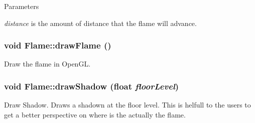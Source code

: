 \begin{DoxyParams}{Parameters}
\item[{\em distance}]is the amount of distance that the flame will advance. \end{DoxyParams}
\hypertarget{classFlame_a71b21d01230de74c83b5357f7a2955f3}{
\subsubsection[{drawFlame}]{\setlength{\rightskip}{0pt plus 5cm}void Flame::drawFlame ()}}
\label{classFlame_a71b21d01230de74c83b5357f7a2955f3}
Draw the flame in OpenGL. \hypertarget{classFlame_a9918c5c5e904393c830fc8672e37bc77}{
\subsubsection[{drawShadow}]{\setlength{\rightskip}{0pt plus 5cm}void Flame::drawShadow (float {\em floorLevel})}}
\label{classFlame_a9918c5c5e904393c830fc8672e37bc77}
Draw Shadow. Draws a shadown at the floor level. This is helfull to the users to get a better perspective on where is the actually the flame.


